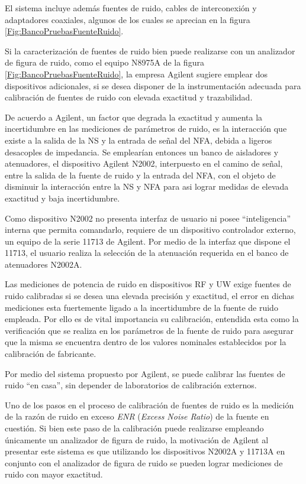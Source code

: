 	El sistema incluye además fuentes de ruido, cables de interconexión y adaptadores coaxiales, algunos de los cuales se aprecian en la figura \ref{Fig:BancoPruebasFuenteRuido}.
	
	Si la caracterización de fuentes de ruido bien puede realizarse con un analizador de figura de ruido, como el equipo N8975A de la figura \ref{Fig:BancoPruebasFuenteRuido}, la empresa Agilent sugiere emplear dos dispositivos adicionales, si se desea disponer de la instrumentación adecuada para calibración de fuentes de ruido con elevada exactitud y trazabilidad. 
	
	De acuerdo a Agilent, un factor que degrada la exactitud y aumenta la incertidumbre en las mediciones de parámetros de ruido, es la interacción que existe a la salida de la NS y la entrada de señal del NFA, debida a ligeros desacoples de impedancia. Se emplearían entonces un banco de aisladores y atenuadores, el dispositivo Agilent N2002, interpuesto en el camino de señal, entre la salida de la fuente de ruido y la entrada del NFA, con el objeto de disminuir la interacción entre la NS y NFA para asi lograr medidas de elevada exactitud y baja incertidumbre.
	
	Como dispositivo N2002 no presenta interfaz de usuario ni posee “inteligencia” interna que permita comandarlo, requiere de un dispositivo controlador externo, un equipo de la serie 11713 de Agilent. Por medio de la interfaz que dispone el 11713, el usuario realiza la selección de la atenuación requerida en el banco de atenuadores N2002A.
	
	Las mediciones de potencia de ruido en dispositivos RF y UW exige fuentes de ruido calibradas si se desea una elevada precisión y exactitud, el error en dichas mediciones esta fuertemente ligado a la incertidumbre de la fuente de ruido	empleada. Por ello es de vital importancia su calibración, entendida esta como la verificación que se realiza en los	parámetros de la fuente de ruido para asegurar que la misma se encuentra dentro de los valores nominales establecidos	por la calibración de fabricante. 
	
	Por medio del sistema propuesto por Agilent, se puede calibrar las fuentes de ruido “en casa”, sin depender de laboratorios de calibración externos.
	
	Uno de los pasos en el proceso de calibración de fuentes de ruido es la medición de la razón de ruido en exceso \emph{ENR} (\emph{Excess Noise Ratio}) de la fuente en cuestión. Si bien este paso de la calibración puede realizarse empleando únicamente un analizador de figura de ruido, la motivación de Agilent al presentar este sistema es que utilizando los dispositivos N2002A y 11713A en conjunto con el analizador de figura de ruido se pueden lograr mediciones de ruido con mayor exactitud. 
	
